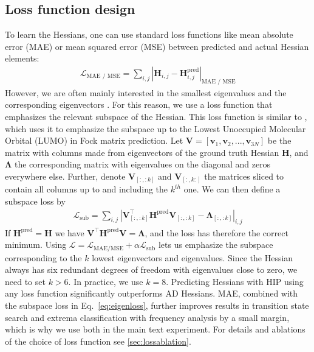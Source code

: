 \documentclass[pdflatex,sn-mathphys-num]{sn-jnl}%
\theoremstyle{thmstyleone}%
\theoremstyle{thmstyletwo}%
\theoremstyle{thmstylethree}%
\begin{document}
\subsection{Loss function design}
To learn the Hessians, one can use standard loss functions like mean absolute error (MAE) or mean squared error (MSE) between predicted and actual Hessian elements:
\begin{align}
    \mathcal{L}_\text{MAE / MSE} = \sum_{i,j} |\mathbf{H}_{i,j} - \mathbf{H}^\text{pred}_{i,j}|_\text{MAE / MSE}
\end{align}
However, we are often mainly interested in the smallest eigenvalues and the corresponding eigenvectors \citep{RSRFO1998a, cerjanFindingTransitionStates1981}. 
For this reason, we use a loss function that emphasizes the relevant subspace of the Hessian. This loss function is similar to \cite{li2025enhancing}, which uses it to emphasize the subspace up to the Lowest Unoccupied Molecular Orbital (LUMO) in Fock matrix prediction.
Let $\mathbf{V} = [\mathbf{v}_1,\mathbf{v}_2,...,\mathbf{v}_{3N}]$ be the matrix with columns made from eigenvectors of the ground truth Hessian $\mathbf{H}$, and $\mathbf{\Lambda}$ the corresponding matrix with eigenvalues on the diagonal and zeros everywhere else. Further, denote $\mathbf{V}_{[:,:k]}$ and $\mathbf{V}_{[:,k:]}$ the matrices sliced to contain all columns up to and including the $k^{th}$ one. We can then define a subspace loss by
\begin{align}
    \mathcal{L}_\text{sub} = \sum_{i,j} \left|\mathbf{V}_{[:,:k]}^\top \mathbf{H}^\text{pred}\mathbf{V}_{[:,:k]} - \mathbf{\Lambda}_{[:,:k]}\right|_{i,j} 
    \label{eq:eigenloss}
\end{align}
If $\mathbf{H}^\text{pred} = \mathbf{H}$ we have $\mathbf{V}^\top \mathbf{H}^\text{pred}\mathbf{V} = \mathbf{\Lambda}$, and the loss has therefore the correct minimum. Using $\mathcal{L}=\mathcal{L}_\text{MAE/MSE}+\alpha\mathcal{L}_\text{sub}$ lets us emphasize the subspace corresponding to the $k$ lowest eigenvectors and eigenvalues. Since the Hessian always has six redundant degrees of freedom with eigenvalues close to zero, we need to set $k>6$. In practice, we use $k=8$.
% 
Predicting Hessians with HIP using any loss function significantly outperforms AD Hessians. MAE, combined with the subspace loss in Eq.~\eqref{eq:eigenloss}, further improves results in transition state search and extrema classification with frequency analysis by a small margin, which is why we use both in the main text experiment. 
For details and ablations of the choice of loss function see \ref{sec:lossablation}. 
\end{document}

